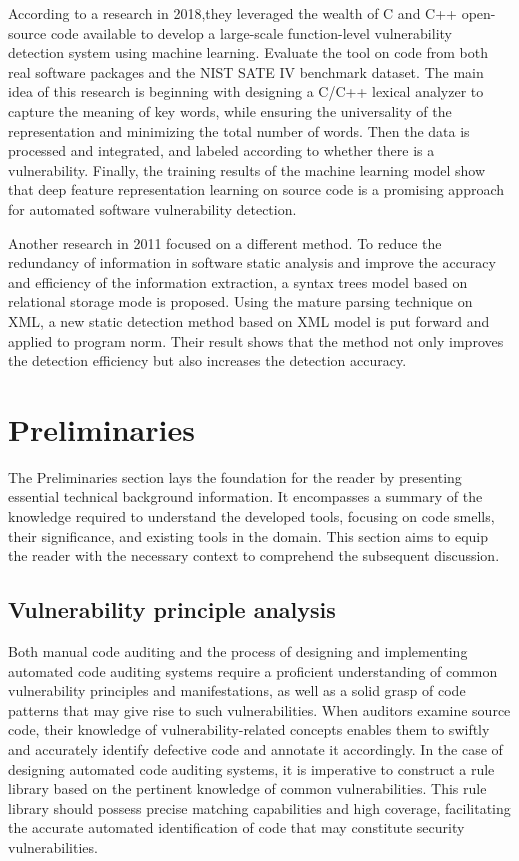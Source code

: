 \documentclass[journal]{IEEEtran}
\begin{document}
According to a research in 2018,they leveraged the wealth of C and C++ open-source code available to develop a large-scale function-level vulnerability detection system using machine learning. Evaluate the tool on code from both real software packages and the NIST SATE IV benchmark dataset\cite{8614145}. The main idea of this research is beginning with designing a C/C++ lexical analyzer to capture the meaning of key words, while ensuring the universality of the representation and minimizing the total number of words. Then the data is processed and integrated, and labeled according to whether there is a vulnerability. Finally, the training results of the machine learning model show that deep feature representation learning on source code is a promising approach for automated software vulnerability detection.

Another research in 2011 focused on a different method. To reduce the redundancy of information in software static analysis and improve the accuracy and efficiency of the information extraction, a syntax trees model based on relational storage mode is proposed. Using the mature parsing technique on XML, a new static detection method based on XML model is put forward and applied to program norm\cite{5997729}. Their result shows that the method not only improves the detection efficiency but also increases the detection accuracy.

\section{Preliminaries}
\label{sec:preliminaries}
\noindent The Preliminaries section lays the foundation for the reader by presenting essential technical background information. It encompasses a summary of the knowledge required to understand the developed tools, focusing on code smells, their significance, and existing tools in the domain. This section aims to equip the reader with the necessary context to comprehend the subsequent discussion.

\subsection{Vulnerability principle analysis}
Both manual code auditing and the process of designing and implementing automated code auditing systems require a proficient understanding of common vulnerability principles and manifestations, as well as a solid grasp of code patterns that may give rise to such vulnerabilities. When auditors examine source code, their knowledge of vulnerability-related concepts enables them to swiftly and accurately identify defective code and annotate it accordingly. In the case of designing automated code auditing systems, it is imperative to construct a rule library based on the pertinent knowledge of common vulnerabilities. This rule library should possess precise matching capabilities and high coverage, facilitating the accurate automated identification of code that may constitute security vulnerabilities.
\end{document}

